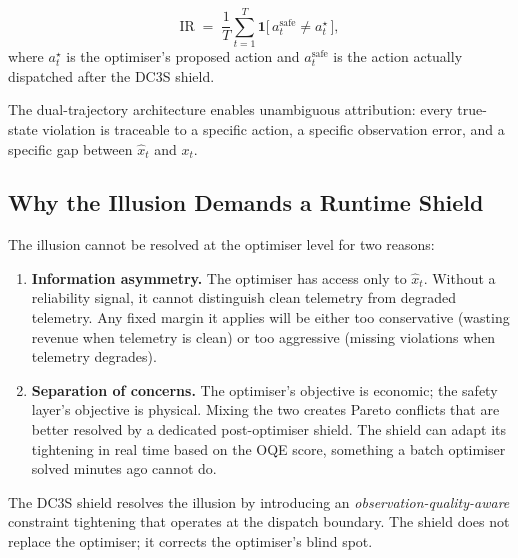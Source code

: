 \begin{definition}
\label{def:ir}
\[
  \mathrm{IR} \;=\; \frac{1}{T} \sum_{t=1}^{T}
  \mathbf{1}\!\bigl[\,a_t^{\mathrm{safe}} \ne a_t^{\star}\,\bigr],
\]
where $a_t^{\star}$ is the optimiser's proposed action and
$a_t^{\mathrm{safe}}$ is the action actually dispatched after the
DC3S shield.
\end{definition}

The dual-trajectory architecture enables unambiguous attribution: every
true-state violation is traceable to a specific action, a specific
observation error, and a specific gap between $\hat{x}_t$ and $x_t$.

\subsection{Why the Illusion Demands a Runtime Shield}
\label{sec:shield-motivation}

The illusion cannot be resolved at the optimiser level for two reasons:

\begin{enumerate}
  \item \textbf{Information asymmetry.}  The optimiser has access only to
    $\hat{x}_t$.  Without a reliability signal, it cannot distinguish
    clean telemetry from degraded telemetry.  Any fixed margin it
    applies will be either too conservative (wasting revenue when
    telemetry is clean) or too aggressive (missing violations when
    telemetry degrades).
  \item \textbf{Separation of concerns.}  The optimiser's objective is
    economic; the safety layer's objective is physical.  Mixing the two
    creates Pareto conflicts that are better resolved by a dedicated
    post-optimiser shield.  The shield can adapt its tightening in
    real time based on the OQE score, something a batch optimiser
    solved minutes ago cannot do.
\end{enumerate}

The DC3S shield resolves the illusion by introducing an
\emph{observation-quality-aware} constraint tightening that operates at
the dispatch boundary.  The shield does not replace the optimiser; it
corrects the optimiser's blind spot.

